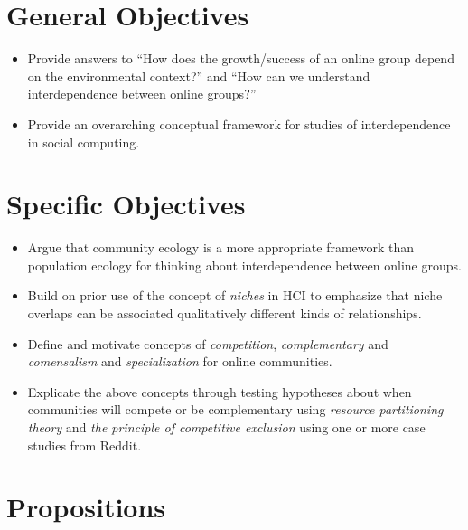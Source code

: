 \documentclass[12pt]{memoir}
\begin{document}
\section{General Objectives}

\begin{itemize}
\item Provide answers to ``How does the growth/success of an online group depend on the environmental context?''  and ``How can we understand interdependence between online groups?''

\item Provide an overarching conceptual framework for studies of interdependence in social computing.

\end{itemize}

\section{Specific Objectives}
\begin{itemize}

\item Argue that community ecology is a more appropriate framework than population ecology for thinking about interdependence between online groups.

\item Build on prior use of the concept of \emph{niches} in HCI to emphasize that niche overlaps can be associated qualitatively different kinds of relationships.   

\item Define and motivate concepts of \emph{competition}, \emph{complementary} and \emph{comensalism} and \emph{specialization} for online communities.

\item Explicate the above concepts through testing hypotheses about when communities will compete or be complementary using \emph{resource partitioning theory} and \emph{the principle of competitive exclusion} using one or more case studies from Reddit.

\end{itemize}

\section{Propositions}
\end{document}
